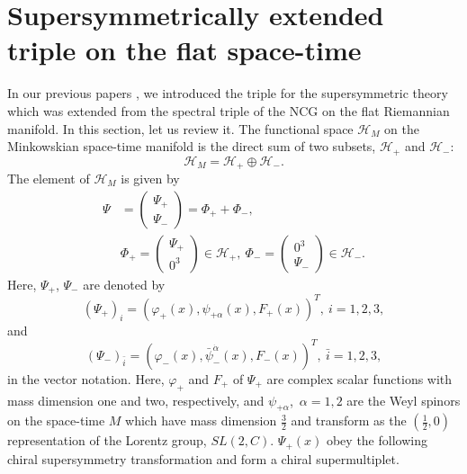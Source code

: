 \documentclass{ptephy}%
\begin{document}
\section{Supersymmetrically extended triple on the flat space-time}
In our previous papers%
, we introduced the triple for the supersymmetric theory which was extended from the spectral triple of the NCG on the 
flat Riemannian manifold. In this section, let us review it.
The functional space $\mathcal{H}_M$ on the Minkowskian space-time manifold 
is the direct sum of two subsets, $\mathcal{H}_+$ and 
$\mathcal{H}_-$:
\begin{equation}
\mathcal{H}_M = \mathcal{H}_+ \oplus \mathcal{H}_-. \label{HM}
\end{equation}
The element of $\mathcal{H}_M$ is given by
\begin{align}
\Psi  & = \begin{pmatrix}
\Psi_+ \\
\Psi_-
\end{pmatrix}
=\Phi_+ + \Phi_-, 
\label{Phi} \\
& \Phi_+=
\begin{pmatrix}
\Psi_+ \\
0^3 
\end{pmatrix} \in \mathcal{H}_+,\ 
\Phi_-= \begin{pmatrix}
0^3 \\
\Psi_-
\end{pmatrix}
\in \mathcal{H}_-.  \label{HpHm}
\end{align} 
Here, $\Psi_+$, $\Psi_-$ are denoted by 
\begin{equation}
(\Psi_+)_i = (\varphi_+(x),\psi_{+\alpha}(x),F_+(x))^T,\ i=1,2,3,  \label{Psi+}
\end{equation}
and 
\begin{equation}
(\Psi_-)_{\bar{i}} = (\varphi_-(x),\bar{\psi}_-^{\dot{\alpha}}(x),F_-(x))^T,\ \bar{i}=1,2,3, \label{Psi-}
\end{equation}
in the vector notation. Here, $\varphi_+$ and $F_+$ of $\Psi_+$ are complex scalar functions with mass dimension one and 
two, respectively, and $\psi_{+ \alpha}$,~$\alpha=1,2$ are 
the Weyl spinors on the space-time $M$ which 
have mass dimension $\frac{3}{2}$  and transform as the $(\frac{1}{2},0)$ representation of 
the Lorentz group, $SL(2,C)$. 
$\Psi_+(x)$ obey the following chiral supersymmetry transformation and 
form a chiral supermultiplet.
\end{document}
